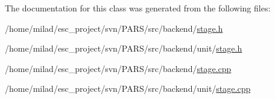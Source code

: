 The documentation for this class was generated from the following files:\begin{DoxyCompactItemize}
\item 
/home/milad/esc\_\-project/svn/PARS/src/backend/\hyperlink{stage_8h}{stage.h}\item 
/home/milad/esc\_\-project/svn/PARS/src/backend/unit/\hyperlink{unit_2stage_8h}{stage.h}\item 
/home/milad/esc\_\-project/svn/PARS/src/backend/\hyperlink{stage_8cpp}{stage.cpp}\item 
/home/milad/esc\_\-project/svn/PARS/src/backend/unit/\hyperlink{unit_2stage_8cpp}{stage.cpp}\end{DoxyCompactItemize}
